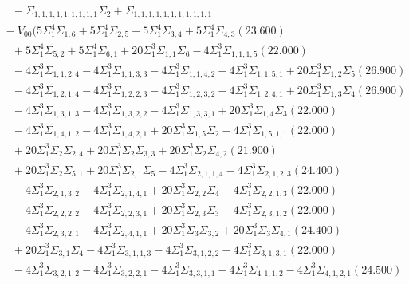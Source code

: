 \documentclass[12pt]{article}
\begin{document}
\begin{landscape}
\begin{align*}
		&\quad\quad -\Sigma_{1,1,1,1,1,1,1,1,1}\Sigma_{2}+\Sigma_{1,1,1,1,1,1,1,1,1,1,1} \\
		&\quad\; -V_{00}(5\Sigma_{1}^{4}\Sigma_{1,6}+5\Sigma_{1}^{4}\Sigma_{2,5}+5\Sigma_{1}^{4}\Sigma_{3,4}+5\Sigma_{1}^{4}\Sigma_{4,3}(23.600) \\ 
		&\quad\quad +5\Sigma_{1}^{4}\Sigma_{5,2}+5\Sigma_{1}^{4}\Sigma_{6,1}+20\Sigma_{1}^{3}\Sigma_{1,1}\Sigma_{6}-4\Sigma_{1}^{3}\Sigma_{1,1,1,5}(22.000) \\ 
		&\quad\quad -4\Sigma_{1}^{3}\Sigma_{1,1,2,4}-4\Sigma_{1}^{3}\Sigma_{1,1,3,3}-4\Sigma_{1}^{3}\Sigma_{1,1,4,2}-4\Sigma_{1}^{3}\Sigma_{1,1,5,1}+20\Sigma_{1}^{3}\Sigma_{1,2}\Sigma_{5}(26.900) \\ 
		&\quad\quad -4\Sigma_{1}^{3}\Sigma_{1,2,1,4}-4\Sigma_{1}^{3}\Sigma_{1,2,2,3}-4\Sigma_{1}^{3}\Sigma_{1,2,3,2}-4\Sigma_{1}^{3}\Sigma_{1,2,4,1}+20\Sigma_{1}^{3}\Sigma_{1,3}\Sigma_{4}(26.900) \\ 
		&\quad\quad -4\Sigma_{1}^{3}\Sigma_{1,3,1,3}-4\Sigma_{1}^{3}\Sigma_{1,3,2,2}-4\Sigma_{1}^{3}\Sigma_{1,3,3,1}+20\Sigma_{1}^{3}\Sigma_{1,4}\Sigma_{3}(22.000) \\ 
		&\quad\quad -4\Sigma_{1}^{3}\Sigma_{1,4,1,2}-4\Sigma_{1}^{3}\Sigma_{1,4,2,1}+20\Sigma_{1}^{3}\Sigma_{1,5}\Sigma_{2}-4\Sigma_{1}^{3}\Sigma_{1,5,1,1}(22.000) \\ 
		&\quad\quad +20\Sigma_{1}^{3}\Sigma_{2}\Sigma_{2,4}+20\Sigma_{1}^{3}\Sigma_{2}\Sigma_{3,3}+20\Sigma_{1}^{3}\Sigma_{2}\Sigma_{4,2}(21.900) \\ 
		&\quad\quad +20\Sigma_{1}^{3}\Sigma_{2}\Sigma_{5,1}+20\Sigma_{1}^{3}\Sigma_{2,1}\Sigma_{5}-4\Sigma_{1}^{3}\Sigma_{2,1,1,4}-4\Sigma_{1}^{3}\Sigma_{2,1,2,3}(24.400) \\ 
		&\quad\quad -4\Sigma_{1}^{3}\Sigma_{2,1,3,2}-4\Sigma_{1}^{3}\Sigma_{2,1,4,1}+20\Sigma_{1}^{3}\Sigma_{2,2}\Sigma_{4}-4\Sigma_{1}^{3}\Sigma_{2,2,1,3}(22.000) \\ 
		&\quad\quad -4\Sigma_{1}^{3}\Sigma_{2,2,2,2}-4\Sigma_{1}^{3}\Sigma_{2,2,3,1}+20\Sigma_{1}^{3}\Sigma_{2,3}\Sigma_{3}-4\Sigma_{1}^{3}\Sigma_{2,3,1,2}(22.000) \\ 
		&\quad\quad -4\Sigma_{1}^{3}\Sigma_{2,3,2,1}-4\Sigma_{1}^{3}\Sigma_{2,4,1,1}+20\Sigma_{1}^{3}\Sigma_{3}\Sigma_{3,2}+20\Sigma_{1}^{3}\Sigma_{3}\Sigma_{4,1}(24.400) \\ 
		&\quad\quad +20\Sigma_{1}^{3}\Sigma_{3,1}\Sigma_{4}-4\Sigma_{1}^{3}\Sigma_{3,1,1,3}-4\Sigma_{1}^{3}\Sigma_{3,1,2,2}-4\Sigma_{1}^{3}\Sigma_{3,1,3,1}(22.000) \\ 
		&\quad\quad -4\Sigma_{1}^{3}\Sigma_{3,2,1,2}-4\Sigma_{1}^{3}\Sigma_{3,2,2,1}-4\Sigma_{1}^{3}\Sigma_{3,3,1,1}-4\Sigma_{1}^{3}\Sigma_{4,1,1,2}-4\Sigma_{1}^{3}\Sigma_{4,1,2,1}(24.500) \\ 

\end{align*}
\end{landscape}
\end{document}
